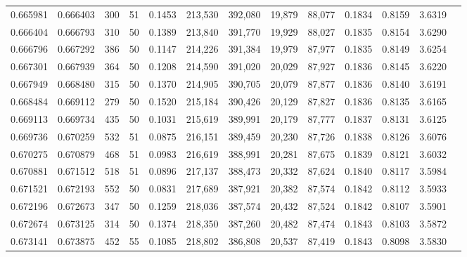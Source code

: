 \begin{tabular}{rrrrrrrrrrrrr}
0.665981 & 0.666403 &   300 &  51 &                                     0.1453 & 213,530 & 392,080 &  19,879 &  88,077 & 0.1834 & 0.8159 & 3.6319 \\
0.666404 & 0.666793 &   310 &  50 &                                     0.1389 & 213,840 & 391,770 &  19,929 &  88,027 & 0.1835 & 0.8154 & 3.6290 \\
0.666796 & 0.667292 &   386 &  50 &                                     0.1147 & 214,226 & 391,384 &  19,979 &  87,977 & 0.1835 & 0.8149 & 3.6254 \\
0.667301 & 0.667939 &   364 &  50 &                                     0.1208 & 214,590 & 391,020 &  20,029 &  87,927 & 0.1836 & 0.8145 & 3.6220 \\
0.667949 & 0.668480 &   315 &  50 &                                     0.1370 & 214,905 & 390,705 &  20,079 &  87,877 & 0.1836 & 0.8140 & 3.6191 \\
0.668484 & 0.669112 &   279 &  50 &                                     0.1520 & 215,184 & 390,426 &  20,129 &  87,827 & 0.1836 & 0.8135 & 3.6165 \\
0.669113 & 0.669734 &   435 &  50 &                                     0.1031 & 215,619 & 389,991 &  20,179 &  87,777 & 0.1837 & 0.8131 & 3.6125 \\
0.669736 & 0.670259 &   532 &  51 &                                     0.0875 & 216,151 & 389,459 &  20,230 &  87,726 & 0.1838 & 0.8126 & 3.6076 \\
0.670275 & 0.670879 &   468 &  51 &                                     0.0983 & 216,619 & 388,991 &  20,281 &  87,675 & 0.1839 & 0.8121 & 3.6032 \\
0.670881 & 0.671512 &   518 &  51 &                                     0.0896 & 217,137 & 388,473 &  20,332 &  87,624 & 0.1840 & 0.8117 & 3.5984 \\
0.671521 & 0.672193 &   552 &  50 &                                     0.0831 & 217,689 & 387,921 &  20,382 &  87,574 & 0.1842 & 0.8112 & 3.5933 \\
0.672196 & 0.672673 &   347 &  50 &                                     0.1259 & 218,036 & 387,574 &  20,432 &  87,524 & 0.1842 & 0.8107 & 3.5901 \\
0.672674 & 0.673125 &   314 &  50 &                                     0.1374 & 218,350 & 387,260 &  20,482 &  87,474 & 0.1843 & 0.8103 & 3.5872 \\
0.673141 & 0.673875 &   452 &  55 &                                     0.1085 & 218,802 & 386,808 &  20,537 &  87,419 & 0.1843 & 0.8098 & 3.5830 \\

\end{tabular}
